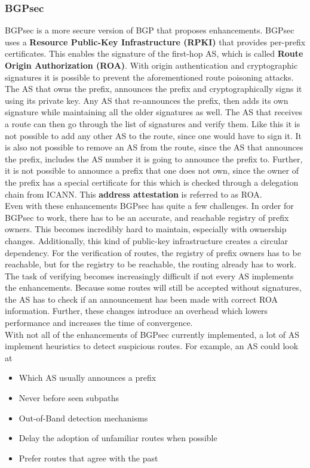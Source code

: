 \subsubsection{BGPsec}
BGPsec is a more secure version of BGP that proposes enhancements. BGPsec uses a \textbf{Resource Public-Key Infrastructure (RPKI)} that provides per-prefix certificates. This enables the signature of the first-hop AS, which is called \textbf{Route Origin Authorization (ROA)}. With origin authentication and cryptographic signatures it is possible to prevent the aforementioned route poisoning attacks.\\
The AS that owns the prefix, announces the prefix and cryptographically signs it using its private key. Any 
AS that re-announces the prefix, then adds its own signature while maintaining all the older signatures as well. The AS that receives a route can then go through the list of signatures and verify them. Like this it is not possible to add any other AS to the route, since one would have to sign it. It is also not possible to remove an AS from the route, since the AS that announces the prefix, includes the AS number it is going to announce the prefix to. Further, it is not possible to announce a prefix that one does not own, since the owner of the prefix has a special certificate for this which is checked through a delegation chain from ICANN. This \textbf{address attestation} is referred to as ROA. \vspace{.3cm}\\

Even with these enhancements BGPsec has quite a few challenges. In order for BGPsec to work, there has to be an accurate, and reachable registry of prefix owners. This becomes incredibly hard to maintain, especially with ownership changes. Additionally, this kind of public-key infrastructure creates a circular dependency. For the verification of routes, the registry of prefix owners has to be reachable, but for the registry to be reachable, the routing already has to work. The task of verifying becomes increasingly difficult if not every AS implements the enhancements. Because some routes will still be accepted without signatures, the AS has to check if an announcement has been made with correct ROA information. Further, these changes introduce an overhead which lowers performance and increases the time of convergence. \\
With not all of the enhancements of BGPsec currently implemented, a lot of AS implement heuristics to detect suspicious routes. For example, an AS could look at
\begin{itemize}
\item Which AS usually announces a prefix
\item Never before seen subpaths
\item Out-of-Band detection mechanisms
\item Delay the adoption of unfamiliar routes when possible
\item Prefer routes that agree with the past
\end{itemize}

